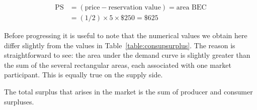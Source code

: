 \begin{align*}
\text{PS}	&=(\text{price}-\text{reservation value})=\text{area BEC}	\\
					&=(1/2)\times 5\times \$250=\$625
\end{align*}

Before progressing it is useful to note that the numerical values we obtain here differ slightly from the values in Table~\ref{table:consupsurplus}. The reason is straightforward to see: the area under the demand curve is slightly greater than the sum of the several rectangular areas, each associated with one market participant. This is equally true on the supply side.

The total surplus that arises in the market is the sum of producer and consumer surpluses.